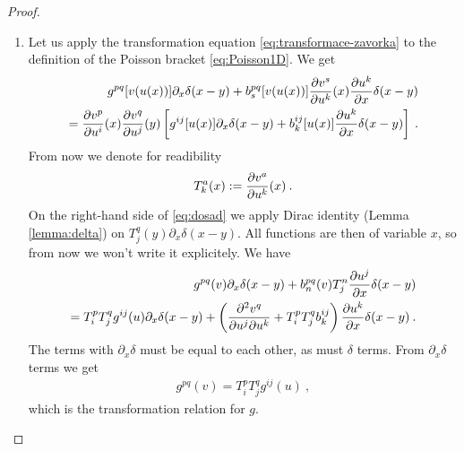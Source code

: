 \begin{proof}
    \begin{enumerate}
        \item Let us apply the transformation equation \eqref{eq:transformace-zavorka} to the definition of the Poisson bracket \eqref{eq:Poisson1D}. We get 
        \begin{align}
            g^{pq}[v(u(x))] \partial_x \delta(x-y) + b^{pq}_s[v(u(x))] \frac{\partial v^s}{\partial u^k}(x) \frac{\partial u^k}{\partial x} \delta(x-y) \nonumber
            \\ = \frac{\partial v^p}{\partial u^i}(x) \frac{\partial v^q}{\partial u^j}(y) \left[ g^{ij}[u(x)] \partial_x \delta(x-y) + b^{ij}_k[u(x)] \frac{\partial u^k}{\partial x} \delta(x-y) \right] \:. \label{eq:dosad}
        \end{align}
        From now we denote for readibility
        \begin{align}
            T^a_k(x) := \frac{\partial v^a}{\partial u^k}(x) \:.
        \end{align}
        On the right-hand side of \eqref{eq:dosad} we apply Dirac identity (Lemma \vref{lemma:delta}) on $T^q_j(y) \partial_x \delta(x-y)$. All functions are then of variable $x$, so from now we won't write it explicitely. We have
        \begin{align}
            g^{pq}(v) \partial_x \delta(x-y) + b^{pq}_n(v) T^n_j \frac{\partial u^j}{\partial x} \delta(x-y) \nonumber
            \\ = T^p_i T^q_j g^{ij}(u) \partial_x \delta(x-y) 
            + \left( \frac{\partial^2 v^q}{\partial u^j \partial u^k} + T^p_i T^q_j b^{ij}_k \right) \frac{\partial u^k}{\partial x} \delta(x-y) \:. \label{eq:porovnani}
        \end{align}
        The terms with $\partial_x \delta$ must be equal to each other, as must $\delta$ terms. From $\partial_x \delta$ terms we get
        \begin{align}
            g^{pq}(v) = T^p_i T^q_j g^{ij}(u) \:,
        \end{align}
        which is the transformation relation for $g$.


\end{enumerate}
\end{proof}
